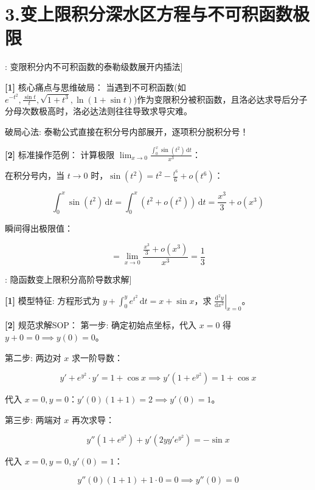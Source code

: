 \documentclass[11pt,a4paper,UTF8]{ctexart}
\begin{document}
\section{3.变上限积分深水区方程与不可积函数极限}

\begin{thmbox}[模型[1]: 变限积分内不可积函数的泰勒级数展开内插法]

\textbf{[1]} 核心痛点与思维破局：
当遇到不可积函数(如 $e^{-t^2}, \frac{\sin t}{t}, \sqrt{1+t^3}, \ln(1+\sin t)$)作为变限积分被积函数，且洛必达求导后分子分母次数极高时，洛必达法则往往导致求导灾难。

破局心法: 泰勒公式直接在积分号内部展开，逐项积分脱积分号！

\textbf{[2]} 标准操作范例：
计算极限 $\lim_{x \to 0} \frac{\int_0^x \sin(t^2)\,\mathrm{d}t}{x^3}$：

在积分号内，当 $t \to 0$ 时，$\sin(t^2) = t^2 - \frac{t^6}{6} + o(t^6)$：


\begin{equation*}
\int_0^x \sin(t^2)\,\mathrm{d}t = \int_0^x \left(t^2 + o(t^2)\right)\,\mathrm{d}t = \frac{x^3}{3} + o(x^3)
\end{equation*}


瞬间得出极限值：


\begin{equation*}
= \lim_{x \to 0} \frac{\frac{x^3}{3} + o(x^3)}{x^3} = \frac{1}{3}
\end{equation*}


\end{thmbox}
\begin{thmbox}[模型[2]: 隐函数变上限积分高阶导数求解]

\textbf{[1]} 模型特征:
方程形式为 $y + \int_0^y e^{t^2}\,\mathrm{d}t = x + \sin x$，求 $\left.\frac{\mathrm{d}^2y}{\mathrm{d}x^2}\right|_{x=0}$。

\textbf{[2]} 规范求解SOP：
第一步: 确定初始点坐标，代入 $x=0$ 得 $y + 0 = 0 \implies y(0) = 0$。

第二步: 两边对 $x$ 求一阶导数：


\begin{equation*}
y' + e^{y^2} \cdot y' = 1 + \cos x \implies y'(1 + e^{y^2}) = 1 + \cos x
\end{equation*}


代入 $x=0, y=0$：$y'(0)(1+1) = 2 \implies y'(0) = 1$。

第三步: 两端对 $x$ 再次求导：


\begin{equation*}
y''(1+e^{y^2}) + y'(2y y' e^{y^2}) = -\sin x
\end{equation*}


代入 $x=0, y=0, y'(0)=1$：


\begin{equation*}
y''(0)(1+1) + 1 \cdot 0 = 0 \implies y''(0) = 0
\end{equation*}


\end{thmbox}
\end{document}
